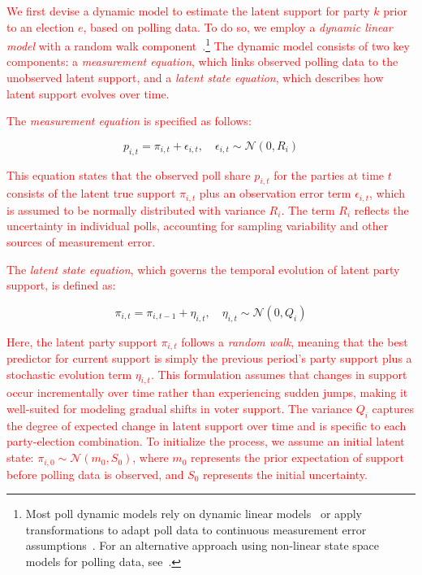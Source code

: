 \documentclass[12pt]{article}
\begin{document}
\begin{doublespacing}
\textcolor{red}{We first devise a dynamic model to estimate the latent support for party \( k \)  prior to an election \( e \), based on polling data. To do so, we employ a \textit{dynamic linear model} with a random walk component~\citep{west1997}.\footnote{Most poll dynamic models rely on dynamic linear models~\citep{walther2015picking} or apply transformations to adapt poll data to continuous measurement error assumptions~\citep{Stoetzer_Neunhoeffer_Gschwend_Munzert_Sternberg_2019}. For an alternative approach using non-linear state space models for polling data, see~\citep{stoetzer2020estimating}.} The dynamic model consists of two key components: a \textit{measurement equation}, which links observed polling data to the unobserved latent support, and a \textit{latent state equation}, which describes how latent support evolves over time.}

\textcolor{red}{The \textit{measurement equation} is specified as follows:}

\begin{equation}
p_{i,t} = \pi_{i,t} + \epsilon_{i,t}, \quad \epsilon_{i,t} \sim \mathcal{N}(0, R_{i})
\end{equation}

\textcolor{red}{This equation states that the observed poll share \( p_{i,t} \) for the parties at time \( t \) consists of the latent true support \( \pi_{i,t} \) plus an observation error term \( \epsilon_{i,t} \), which is assumed to be normally distributed with variance \( R_i \). The term \( R_i \) reflects the uncertainty in individual polls, accounting for sampling variability and other sources of measurement error.}

\textcolor{red}{The \textit{latent state equation}, which governs the temporal evolution of latent party support, is defined as:}

\begin{equation}
\pi_{i,t} = \pi_{i,t-1} + \eta_{i,t}, \quad \eta_{i,t} \sim \mathcal{N}(0, Q_{i})
\end{equation}

\textcolor{red}{Here, the latent party support \( \pi_{i,t} \) follows a \textit{random walk}, meaning that the best predictor for current support is simply the previous period’s party support plus a stochastic evolution term \( \eta_{i,t} \). This formulation assumes that changes in support occur incrementally over time rather than experiencing sudden jumps, making it well-suited for modeling gradual shifts in voter support. The variance \( Q_i \) captures the degree of expected change in latent support over time and is specific to each party-election combination. To initialize the process, we assume an initial latent state: $\pi_{i,0} \sim \mathcal{N}(m_0, S_0)
$, where \( m_0 \) represents the prior expectation of support before polling data is observed, and \( S_0 \) represents the initial uncertainty.}


\end{doublespacing}
\end{document}
